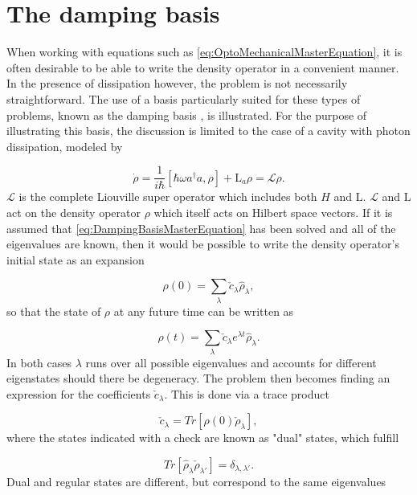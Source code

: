 \documentclass[12pt]{article}
\begin{document}
\section{The damping basis}

When working with equations such as \ref{eq:OptoMechanicalMasterEquation}, it is often desirable to be able to write the density operator in a convenient manner.  In the presence of dissipation however, the problem is not necessarily straightforward. The use of a basis particularly suited for these types of problems, known as the damping basis \cite{BriegelDampingBasis1993}, is illustrated. For the purpose of illustrating this basis, the discussion is limited to the case of a cavity with photon dissipation, modeled by

\begin{equation}\label{eq:DampingBasisMasterEquation}
    \dot{\rho} = \frac{1}{i\hbar}[\hbar \omega a^\dagger a,\rho] +\mathrm{L}_a\rho = \mathcal{L}\rho.
\end{equation} $\mathcal{L}$ is the complete Liouville super operator which includes both $H$ and $\mathrm{L}$. $\mathcal{L}$ and $\mathrm{L}$ act on the density operator $\rho$ which itself acts on Hilbert space vectors. If it is assumed that \ref{eq:DampingBasisMasterEquation} has been solved and all of the eigenvalues are known, then it would be possible to write the density operator's initial state as an expansion

\begin{equation}
    \rho(0) = \sum_{\lambda} \check{c}_{\lambda} \hat{\rho}_{\lambda}, 
\end{equation} so that the state of $\rho$ at any future time can be written as

\begin{equation}
    \rho(t) = \sum_{\lambda} \check{c}_{\lambda} e^{\lambda t}\hat{\rho}_{\lambda}. 
\end{equation} In both cases $\lambda$ runs over all possible eigenvalues and accounts for different eigenstates should there be degeneracy. The problem then becomes finding an expression for the coefficients $\check{c}_{\lambda}$. This is done via a trace product

\begin{equation}
    \check{c}_\lambda = Tr[\rho(0)\check{\rho}_\lambda],
\end{equation} where the states indicated with a check are known as "dual" states, which fulfill

\begin{equation}
    Tr[\hat{\rho}_{\lambda} \check{\rho}_{\lambda'}] = \delta_{\lambda,\lambda'}. 
\end{equation} Dual and regular states are different, but correspond to the same eigenvalues
\end{document}
